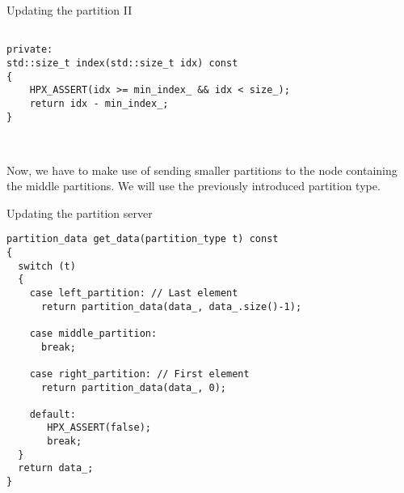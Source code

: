 \documentclass[12pt,t]{beamer}
\begin{document}
\begin{frame}[fragile]{Updating the partition II }

\begin{lstlisting}

private:
std::size_t index(std::size_t idx) const
{
	HPX_ASSERT(idx >= min_index_ && idx < size_);
    return idx - min_index_;
}

	
\end{lstlisting}
\vspace{1cm}
Now, we have to make use of sending smaller partitions to the node containing the middle partitions. We will use the previously introduced partition type. 

\end{frame}


\begin{frame}[fragile]{Updating the partition server}

\begin{lstlisting}
partition_data get_data(partition_type t) const
{
  switch (t)
  {
    case left_partition: // Last element
      return partition_data(data_, data_.size()-1);

    case middle_partition:
      break;

    case right_partition: // First element
      return partition_data(data_, 0);

    default:
       HPX_ASSERT(false);
       break;
  }
  return data_;
}

\end{lstlisting}


\end{frame}
\end{document}
